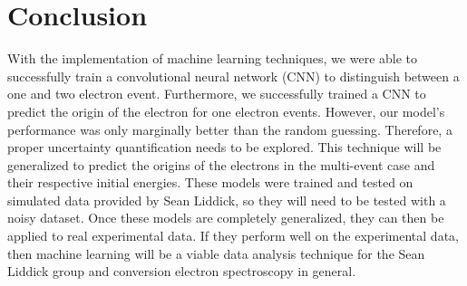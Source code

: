 \documentclass[12pt]{article}
\begin{document}
\section{Conclusion}
With the implementation of machine learning techniques, we were able to successfully train a convolutional neural network (CNN) to distinguish between a one and two electron event. Furthermore, we successfully trained a CNN to predict the origin of the electron for one electron events. However, our model's performance was only marginally better than the random guessing. Therefore, a proper uncertainty quantification needs to be explored. This technique will be generalized to predict the origins of the electrons in the multi-event case and their respective initial energies. These models were trained and tested on simulated data provided by Sean Liddick, so they will need to be tested with a noisy dataset. Once these models are completely generalized, they can then be applied to real experimental data. If they perform well on the experimental data, then machine learning will be a viable data analysis technique for the Sean Liddick group and conversion electron spectroscopy in general.

\newpage

\printbibliography
\end{document}
